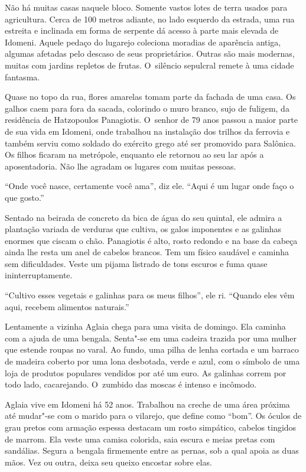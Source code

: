 Não há muitas casas naquele bloco. Somente vastos lotes de terra
usados para agricultura. Cerca de 100 metros adiante, no lado esquerdo
da estrada, uma rua estreita e inclinada em forma de serpente dá acesso
à parte mais elevada de Idomeni. Aquele pedaço do lugarejo coleciona
moradias de aparência antiga, algumas afetadas pelo descaso de seus
proprietários. Outras são mais modernas, muitas com jardins repletos de
frutas. O~silêncio sepulcral remete à uma cidade fantasma.

Quase no topo da rua, flores amarelas tomam parte da fachada de uma
casa. Os galhos caem para fora da sacada, colorindo o muro branco, sujo
de fuligem, da residência de Hatzopoulos Panagiotis. O~senhor de 79 anos
passou a maior parte de sua vida em Idomeni, onde trabalhou na instalação dos
trilhos da ferrovia e também serviu como soldado do exército grego até
ser promovido para Salônica. Os filhos ficaram na metrópole, enquanto
ele retornou ao seu lar após a aposentadoria. Não lhe agradam os lugares
com muitas pessoas.

``Onde você nasce, certamente você ama'', diz ele. ``Aqui é um lugar
onde faço o que gosto.''

Sentado na beirada de concreto da bica de água do seu quintal, ele
admira a plantação variada de verduras que cultiva, os galos imponentes
e as galinhas enormes que ciscam o chão. Panagiotis
é alto, rosto redondo e na base da cabeça ainda lhe resta um anel de
cabelos brancos. Tem um físico saudável e caminha sem dificuldades. Veste
um pijama listrado de tons escuros e fuma quase ininterruptamente.

``Cultivo esses vegetais e galinhas para os meus filhos'', ele ri.
``Quando eles vêm aqui, recebem alimentos naturais.''

Lentamente a vizinha Aglaia chega para uma visita de domingo. Ela
caminha com a ajuda de uma bengala. Senta"-se em uma cadeira trazida por
uma mulher que estende roupas no varal. Ao fundo, uma pilha de lenha
cortada e um barraco de madeira coberto por uma lona desbotada, verde e azul, com o
símbolo de uma loja de produtos populares vendidos por até um euro.
As galinhas correm por todo lado, cacarejando. O~zumbido das
moscas é intenso e incômodo.

Aglaia vive em Idomeni há 52 anos. Trabalhou na creche de uma área
próxima até mudar"-se com o marido para o vilarejo, que define como
``bom''. Os óculos de grau pretos com armação espessa destacam um rosto
simpático, cabelos tingidos de marrom. Ela veste uma camisa colorida,
saia escura e meias pretas com sandálias. Segura a bengala firmemente entre as pernas,
sob a qual apoia as duas mãos. Vez ou outra, deixa seu queixo
encostar sobre elas.

